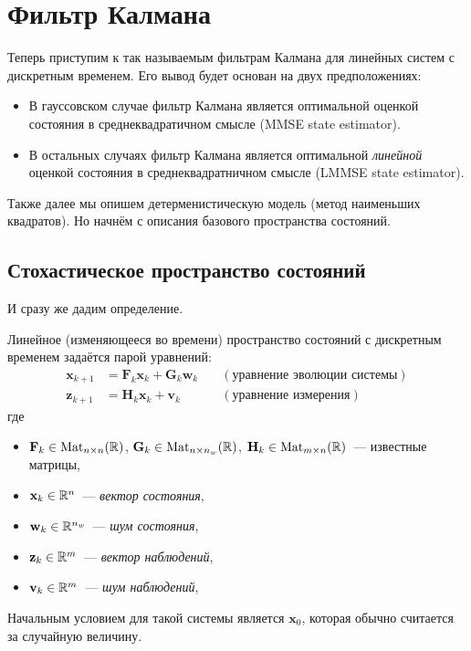 \section{Фильтр Калмана}
Теперь приступим к так называемым фильтрам Калмана для линейных систем с 
дискретным временем. Его вывод будет основан на двух предположениях:
\begin{itemize}
	\item В гауссовском случае фильтр Калмана является оптимальной оценкой 
	состояния в среднеквадратичном смысле (MMSE state estimator).  
	\item В остальных случаях фильтр Калмана является оптимальной 
	\emph{линейной} оценкой состояния в среднеквадратничном смысле (LMMSE state 
	estimator).
\end{itemize}

Также далее мы опишем детерменистическую модель (метод наименьших квадратов). 
Но начнём с описания базового пространства состояний.

\subsection{Стохастическое пространство состояний}
И сразу же дадим определение.
\begin{definition}
	Линейное (изменяющееся во времени) пространство состояний с дискретным 
	временем задаётся парой уравнений:
	\begin{align*}
		\mathbf{x}_{k + 1} &= \mathbf{F}_{k}\mathbf{x}_{k} + \mathbf{G}_{k} 
		\mathbf{w}_{k}& \quad (\text{уравнение эволюции системы}) \\
		\mathbf{z}_{k + 1} &= \mathbf{H}_{k}\mathbf{x}_{k} + \mathbf{v}_{k}&
		\quad (\text{уравнение измерения})
	\end{align*}
	где
	\begin{itemize}
		\item \(\mathbf{F}_{k} \in \mathrm{Mat}_{n \times n}(\mathbb{R})\), 
		\(\mathbf{G}_{k} \in \mathrm{Mat}_{n \times n_{w}}(\mathbb{R})\), 
		\(\mathbf{H}_{k} \in \mathrm{Mat}_{m \times n}(\mathbb{R})\)~--- известные 
		матрицы,
		\item \(\mathbf{x}_{k} \in \mathbb{R}^{n}\)~--- \emph{вектор состояния},
		\item \(\mathbf{w}_{k} \in \mathbb{R}^{n_{w}}\)~--- \emph{шум состояния},
		\item \(\mathbf{z}_{k} \in \mathbb{R}^{m}\)~--- \emph{вектор наблюдений},
		\item \(\mathbf{v}_{k} \in \mathbb{R}^{m}\)~--- \emph{шум наблюдений},
	\end{itemize}

	Начальным условием для такой системы является \(\mathbf{x}_{0}\), которая 
	обычно считается за случайную величину.
\end{definition}

